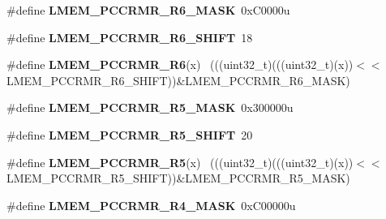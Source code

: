 \begin{DoxyCompactItemize}
\item 
\hypertarget{group___l_m_e_m___register___masks_ga2b03989463fe6bb31533b39c6d867ddf}{}\#define {\bfseries L\+M\+E\+M\+\_\+\+P\+C\+C\+R\+M\+R\+\_\+\+R6\+\_\+\+M\+A\+S\+K}~0x\+C0000u\label{group___l_m_e_m___register___masks_ga2b03989463fe6bb31533b39c6d867ddf}

\item 
\hypertarget{group___l_m_e_m___register___masks_ga38f0ea60d071ff7782f01c69774393c8}{}\#define {\bfseries L\+M\+E\+M\+\_\+\+P\+C\+C\+R\+M\+R\+\_\+\+R6\+\_\+\+S\+H\+I\+F\+T}~18\label{group___l_m_e_m___register___masks_ga38f0ea60d071ff7782f01c69774393c8}

\item 
\hypertarget{group___l_m_e_m___register___masks_gac10e04c2543c33b338965ac1816b1cbd}{}\#define {\bfseries L\+M\+E\+M\+\_\+\+P\+C\+C\+R\+M\+R\+\_\+\+R6}(x)                                            ~(((uint32\+\_\+t)(((uint32\+\_\+t)(x))$<$$<$L\+M\+E\+M\+\_\+\+P\+C\+C\+R\+M\+R\+\_\+\+R6\+\_\+\+S\+H\+I\+F\+T))\&L\+M\+E\+M\+\_\+\+P\+C\+C\+R\+M\+R\+\_\+\+R6\+\_\+\+M\+A\+S\+K)\label{group___l_m_e_m___register___masks_gac10e04c2543c33b338965ac1816b1cbd}

\item 
\hypertarget{group___l_m_e_m___register___masks_ga8deef68c680c4322defe48d41fe13516}{}\#define {\bfseries L\+M\+E\+M\+\_\+\+P\+C\+C\+R\+M\+R\+\_\+\+R5\+\_\+\+M\+A\+S\+K}~0x300000u\label{group___l_m_e_m___register___masks_ga8deef68c680c4322defe48d41fe13516}

\item 
\hypertarget{group___l_m_e_m___register___masks_ga7b7edd294a68e05a06fa6ffa8ae2ce4c}{}\#define {\bfseries L\+M\+E\+M\+\_\+\+P\+C\+C\+R\+M\+R\+\_\+\+R5\+\_\+\+S\+H\+I\+F\+T}~20\label{group___l_m_e_m___register___masks_ga7b7edd294a68e05a06fa6ffa8ae2ce4c}

\item 
\hypertarget{group___l_m_e_m___register___masks_gab59a20b1e15d1335eb7a403a6d863b8f}{}\#define {\bfseries L\+M\+E\+M\+\_\+\+P\+C\+C\+R\+M\+R\+\_\+\+R5}(x)                                            ~(((uint32\+\_\+t)(((uint32\+\_\+t)(x))$<$$<$L\+M\+E\+M\+\_\+\+P\+C\+C\+R\+M\+R\+\_\+\+R5\+\_\+\+S\+H\+I\+F\+T))\&L\+M\+E\+M\+\_\+\+P\+C\+C\+R\+M\+R\+\_\+\+R5\+\_\+\+M\+A\+S\+K)\label{group___l_m_e_m___register___masks_gab59a20b1e15d1335eb7a403a6d863b8f}

\item 
\hypertarget{group___l_m_e_m___register___masks_ga247a39af82129885d1012e95d7e221d6}{}\#define {\bfseries L\+M\+E\+M\+\_\+\+P\+C\+C\+R\+M\+R\+\_\+\+R4\+\_\+\+M\+A\+S\+K}~0x\+C00000u\label{group___l_m_e_m___register___masks_ga247a39af82129885d1012e95d7e221d6}


\end{DoxyCompactItemize}
